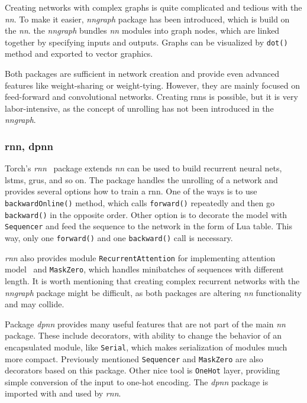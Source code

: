 Creating networks with complex graphs is quite complicated and tedious with the \emph{nn}. To make it easier, \emph{nngraph} package has been introduced, which is build on the \emph{nn}. the \emph{nngraph} bundles \emph{nn} modules into graph nodes, which are linked together by specifying inputs and outputs. Graphs can be visualized by \texttt{dot()} method and exported to vector graphics.

Both packages are sufficient in network creation and provide even advanced features like weight-sharing or weight-tying. However, they are mainly focused on feed-forward and convolutional networks. Creating \gls{rnn}s is possible, but it is very labor-intensive, as the concept of unrolling has not been introduced in the \emph{nngraph}.

\subsubsection{rnn, dpnn}\label{subsec:torch-rnn}

Torch's \emph{rnn}~\cite{DBLP:journals/corr/LeonardWW15} package extends \emph{nn} can be used to build recurrent neural nets, \gls{lstm}s, \gls{gru}s, and so on. The package handles the unrolling of a network and provides several options how to train a \gls{rnn}. One of the ways is to use \texttt{backwardOnline()} method, which calls \texttt{forward()} repeatedly and then go \texttt{backward()} in the opposite order. Other option is to decorate the model with \texttt{Sequencer} and feed the sequence to the network in the form of Lua table. This way, only one \texttt{forward()} and one \texttt{backward()} call is necessary.

\emph{rnn} also provides module \texttt{RecurrentAttention} for implementing attention model~\cite{DBLP:journals/corr/MnihHGK14} and \texttt{MaskZero}, which handles minibatches of sequences with different length. It is worth mentioning that creating complex recurrent networks with the \emph{nngraph} package might be difficult, as both packages are altering \emph{nn} functionality and may collide.

Package \emph{dpnn} provides many useful features that are not part of the main \emph{nn} package. These include decorators, with ability to change the behavior of an encapsulated module, like \texttt{Serial}, which makes serialization of modules much more compact. Previously mentioned \texttt{Sequencer} and \texttt{MaskZero} are also decorators based on this package. Other nice tool is \texttt{OneHot} layer, providing simple conversion of the input to one-hot encoding. The \emph{dpnn} package is imported with and used by \emph{rnn}.

